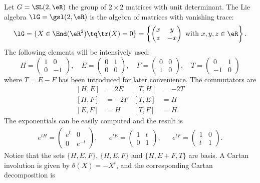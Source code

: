 Let $G=\SL(2,\eR)$ the group of $2\times 2$ matrices with unit determinant. The Lie algebra $\lG=\gsl(2,\eR)$ is the algebra of matrices with vanishing trace:
\begin{equation}
 \lG =  \{ X\in\End(\eR^2)\tq \tr(X) = 0\} 
=\left\{ \begin{pmatrix}
x & y \\
z & -x
\end{pmatrix}\textrm{ with }x,y,z\in\eR  \right\}. 
\end{equation}
The following elements will be intensively used:\label{PgBaseSLdeuxRHEF}
\[
H=\begin{pmatrix}
1 & 0 \\
0 & -1
\end{pmatrix}
,\quad
  E=\begin{pmatrix}
0 & 1 \\
0 & 0
\end{pmatrix}
,\quad
 F=\begin{pmatrix}
0 & 0 \\
1 & 0
\end{pmatrix},
\quad
T=\begin{pmatrix}
0&1\\
-1&0
\end{pmatrix}
\]
where $T=E-F$ has been introduced for later convenience. The commutators are
\begin{subequations}\label{EqTableSLdR}
\begin{align}  
  [H,E]&=2E	&[T,H]&=-2T  \\
  [H,F]&=-2F	&[T,E]&=H   \\
  [E,F]&=H	&[T,F]&=H.
\end{align}
\end{subequations}
The exponentials can be easily computed and the result is
\begin{align}				\label{EqExpMatrsSLdeuxR}
 e^{tH}=
\begin{pmatrix}
   e^{t}	&	0	\\ 
  0	&	 e^{-t}	
\end{pmatrix},
&&
 e^{tE}=
\begin{pmatrix}
  1	&	t	\\ 
  0	&	1	
\end{pmatrix},
&&
 e^{tF}=
\begin{pmatrix}
  1	&	0	\\ 
  t	&	1	
\end{pmatrix}.
\end{align}
Notice that the sets $\{ H,E,F \}$, $\{ H,E,F \}$ and $\{ H,E+F,T \}$ are basis. A Cartan involution is given by $\theta(X)=-X^t$, and the corresponding Cartan decomposition is
